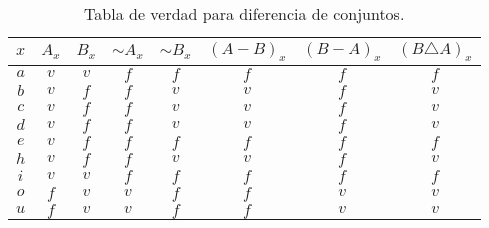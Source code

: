 \begin{table}[H]
\centering

\caption{Tabla de verdad para diferencia de conjuntos.}

\setlength\arrayrulewidth{1pt} 

\begin{tabular}{ccccccc|c}
\arrayrulecolor{ptctitle}\hline\cellcolor{ptctitle!50}$x$ &
\cellcolor{ptctitle!50}$A_{x}$ &
\cellcolor{ptctitle!50}$B_{x}$ &
\cellcolor{ptctitle!50}$\sim A_{x}$ &
\cellcolor{ptctitle!50}$\sim B_{x}$ &
\cellcolor{ptctitle!50}$\left(A-B\right)_{x}$ &
\cellcolor{ptctitle!50}$\left(B-A\right)_{x}$ &
\cellcolor{ptctitle!50}$\left(B\triangle A\right)_{x}$\tabularnewline
\hline\cellcolor{ptcbackground}$a$ &
\cellcolor{ptcbackground} $v$ &
\cellcolor{ptcbackground} $v$ &
\cellcolor{ptcbackground} $f$ &
\cellcolor{ptcbackground} $f$ &
\cellcolor{ptcbackground}$f$ &
\cellcolor{ptcbackground}$f$ &
\cellcolor{ptcbackground}$f$\tabularnewline
\hline\cellcolor{gray!50}$b$ &
\cellcolor{gray!50} $v$ &
\cellcolor{gray!50} $f$ &
\cellcolor{gray!50} $f$ &
\cellcolor{gray!50} $v$ &
\cellcolor{gray!50}$v$ &
\cellcolor{gray!50}$f$ &
\cellcolor{gray!50}$v$\tabularnewline
\hline\cellcolor{ptcbackground}$c$ &
\cellcolor{ptcbackground} $v$ &
\cellcolor{ptcbackground} $f$ &
\cellcolor{ptcbackground} $f$ &
\cellcolor{ptcbackground} $v$ &
\cellcolor{ptcbackground} $v$ &
\cellcolor{ptcbackground} $f$ &
\cellcolor{ptcbackground} $v$\tabularnewline
\hline\cellcolor{gray!50}$d$ &
\cellcolor{gray!50} $v$ &
\cellcolor{gray!50} $f$ &
\cellcolor{gray!50} $f$ &
\cellcolor{gray!50} $v$ &
\cellcolor{gray!50} $v$ &
\cellcolor{gray!50} $f$ &
\cellcolor{gray!50} $v$\tabularnewline
\hline\cellcolor{ptcbackground}$e$ &
\cellcolor{ptcbackground} $v$ &
\cellcolor{ptcbackground} $f$ &
\cellcolor{ptcbackground} $f$ &
\cellcolor{ptcbackground} $f$ &
\cellcolor{ptcbackground} $f$ &
\cellcolor{ptcbackground} $f$ &
\cellcolor{ptcbackground} $f$\tabularnewline
\hline\cellcolor{gray!50}$h$ &
\cellcolor{gray!50} $v$ &
\cellcolor{gray!50} $f$ &
\cellcolor{gray!50} $f$ &
\cellcolor{gray!50} $v$ &
\cellcolor{gray!50} $v$ &
\cellcolor{gray!50} $f$ &
\cellcolor{gray!50} $v$\tabularnewline
\hline\cellcolor{ptcbackground}$i$ &
\cellcolor{ptcbackground} $v$ &
\cellcolor{ptcbackground} $v$ &
\cellcolor{ptcbackground} $f$ &
\cellcolor{ptcbackground} $f$ &
\cellcolor{ptcbackground} $f$ &
\cellcolor{ptcbackground} $f$ &
\cellcolor{ptcbackground} $f$\tabularnewline
\hline\cellcolor{gray!50}$o$ &
\cellcolor{gray!50} $f$ &
\cellcolor{gray!50} $v$ &
\cellcolor{gray!50} $v$ &
\cellcolor{gray!50} $f$ &
\cellcolor{gray!50} $f$ &
\cellcolor{gray!50} $v$ &
\cellcolor{gray!50} $v$\tabularnewline
\hline\cellcolor{ptcbackground}$u$ &
\cellcolor{ptcbackground} $f$ &
\cellcolor{ptcbackground} $v$ &
\cellcolor{ptcbackground} $v$ &
\cellcolor{ptcbackground} $f$ &
\cellcolor{ptcbackground} $f$ &
\cellcolor{ptcbackground} $v$ &
\cellcolor{ptcbackground} $v$\tabularnewline
\end{tabular}

\label{tdifs}
\end{table}

